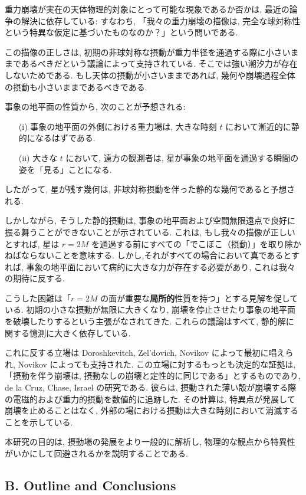 \documentclass[a4paper,12pt]{article}
\begin{document}
重力崩壊が実在の天体物理的対象にとって可能な現象であるか否かは, 最近の論争の解決に依存している: すなわち, 「我々の重力崩壊の描像は, 完全な球対称性という特異な仮定に基づいたものなのか？」という問いである.

この描像の正しさは, 初期の非球対称な摂動が重力半径を通過する際に小さいままであるべきだという議論によって支持されている. そこでは強い潮汐力が存在しないためである. もし天体の摂動が小さいままであれば, 幾何や崩壊過程全体の摂動も小さいままであるべきである.

事象の地平面の性質から, 次のことが予想される:

\begin{itemize}
    \item[(i)] 事象の地平面の外側における重力場は, 大きな時刻 $t$ において漸近的に静的になるはずである.
    \item[(ii)] 大きな $t$ において, 遠方の観測者は, 星が事象の地平面を通過する瞬間の姿を「見る」ことになる.
\end{itemize}

したがって, 星が残す幾何は, 非球対称摂動を伴った静的な幾何であると予想される. 

しかしながら, そうした静的摂動は, 事象の地平面および空間無限遠点で良好に振る舞うことができないことが示されている. これは, もし我々の描像が正しいとすれば, 星は $r = 2M$ を通過する前にすべての「でこぼこ（摂動）」を取り除かねばならないことを意味する. しかし,それがすべての場合において真であるとすれば, 事象の地平面において病的に大きな力が存在する必要があり, これは我々の期待に反する.

こうした困難は「$r = 2M$ の面が重要な\textbf{局所的}性質を持つ」とする見解を促している. 初期の小さな摂動が無限に大きくなり, 崩壊を停止させたり事象の地平面を破壊したりするという主張がなされてきた. これらの議論はすべて, 静的解に関する憶測に大きく依存している.

これに反する立場は Doroshkevitch, Zel'dovich, Novikov によって最初に唱えられ, Novikov によっても支持された. この立場に対するもっとも決定的な証拠は, 「摂動を伴う崩壊は, 摂動なしの崩壊と定性的に同じである」とするものであり, de la Cruz, Chase, Israel の研究である. 彼らは, 摂動された薄い殻が崩壊する際の電磁的および重力的摂動を数値的に追跡した. その計算は, 特異点が発展して崩壊を止めることはなく, 外部の場における摂動は大きな時刻において消滅することを示している.

本研究の目的は, 摂動場の発展をより一般的に解析し, 物理的な観点から特異性がいかにして回避されるかを説明することである.

\subsection*{B. Outline and Conclusions}
\end{document}
